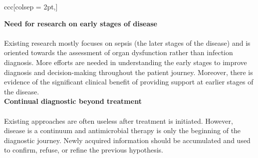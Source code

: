 \begin{table*}[h!]
\begin{tblr}{ccc}[colsep = 2pt,]
\begin{tblr}[T]
            {\textbf{Need for research on early stages of disease} \\ \vspace{0.1cm} \\ Existing research mostly focuses on sepsis (the later stages of the disease) and is oriented towards the assessment of organ dysfunction rather than infection diagnosis. More efforts are needed in understanding the early stages to improve diagnosis and decision-making throughout the patient journey. Moreover, there is evidence of the significant clinical benefit of providing support at earlier stages of the disease.} \\
            
            {\textbf{Continual diagnostic beyond treatment } \\ \vspace{0.1cm} \\ Existing approaches are often useless after treatment is initiated. However, disease is a continuum and antimicrobial therapy is only the beginning of the diagnostic journey. Newly acquired information should be accumulated and used to confirm, refuse, or refine the previous hypothesis.} \vspace{0.15cm}

    
    
    
    
    

            \bottomrule
            
        \end{tblr}
    \end{tblr}
\end{table*}